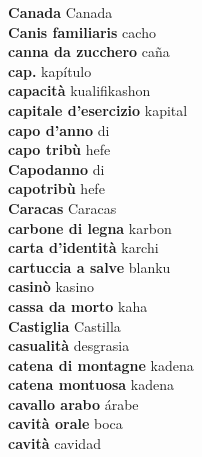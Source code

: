 \textbf{ Canada  } Canada \\
\textbf{ Canis familiaris  } cacho \\
\textbf{ canna da zucchero  } caña \\
\textbf{ cap.  } kapítulo \\
\textbf{ capacità  } kualifikashon \\
\textbf{ capitale d’esercizio  } kapital \\
\textbf{ capo d’anno  } di \\
\textbf{ capo tribù  } hefe \\
\textbf{ Capodanno  } di \\
\textbf{ capotribù  } hefe \\
\textbf{ Caracas  } Caracas \\
\textbf{ carbone di legna  } karbon \\
\textbf{ carta d’identità  } karchi \\
\textbf{ cartuccia a salve  } blanku \\
\textbf{ casinò  } kasino \\
\textbf{ cassa da morto  } kaha \\
\textbf{ Castiglia  } Castilla \\
\textbf{ casualità  } desgrasia \\
\textbf{ catena di montagne  } kadena \\
\textbf{ catena montuosa  } kadena \\
\textbf{ cavallo arabo  } árabe \\
\textbf{ cavità orale  } boca \\
\textbf{ cavità  } cavidad \\
